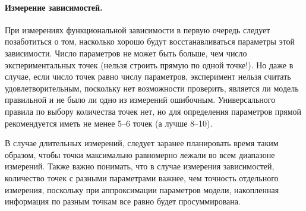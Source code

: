 


\paragraph{Измерение зависимостей.}
При измерениях функциональной зависимости в первую очередь следует позаботиться
о том, насколько хорошо будут восстанавливаться параметры этой зависимости.
Число параметров не может быть больше, чем число экспериментальных точек
(нельзя строить прямую по одной точке!). Но даже в случае, если число точек
равно числу параметров, эксперимент нельзя считать удовлетворительным, поскольку
нет возможности проверить, является ли модель правильной и не было ли одно из
измерений ошибочным. Универсального правила по выбору количества точек нет, но для
определения параметров прямой рекомендуется иметь не менее 5--6 точек
(а лучше 8--10). 

В случае длительных измерений, следует заранее планировать время
таким образом, чтобы точки максимально равномерно лежали во всем диапазоне
измерений. Также важно понимать, что в случае измерения зависимостей, количество
точек с разными параметрами важнее, чем точность отдельного измерения, поскольку
при аппроксимации параметров модели, накопленная информация по разным точкам
все равно будет просуммирована.

